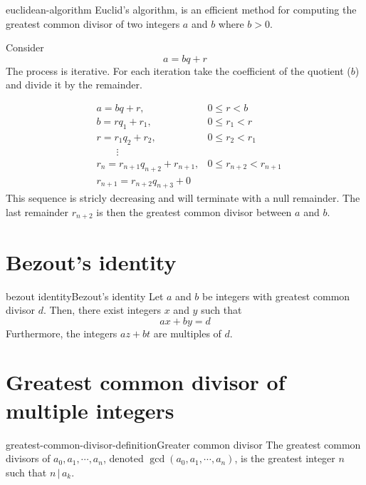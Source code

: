 \documentclass[preview]{standalone}
\newcommand{\divides}{\,|\,}
\begin{document}
\begin{snippet}{euclidean-algorithm}
Euclid's algorithm, is an efficient method for computing the greatest common divisor of two integers
\(a\) and \(b\) where \(b > 0\).

Consider
\[
    a = bq + r
\]
The process is iterative.
For each iteration take the coefficient of the quotient (\(b\)) and divide it by the remainder.

\begin{align*}
    &a = bq + r, &0 \leq r < b \\
    &b = rq_1 + r_1, &0 \leq r_1 < r \\
    &r = r_1q_2 + r_2, &0 \leq r_2 < r_1 \\
    \phantom{ } &\qquad \vdots & \\
    &r_n = r_{n+1}q_{n+2} + r_{n+1}, &0 \leq r_{n+2} < r_{n+1} \\
    &r_{n+1} = r_{n+2}q_{n+3} + 0&
\end{align*}
This sequence is stricly decreasing and will terminate with a null remainder.
The last remainder \(r_{n+2}\) is then the greatest common divisor between \(a\) and \(b\).
\end{snippet}

\section{Bezout's identity}

\begin{snippettheorem}{bezout identity}{Bezout's identity}
    Let \(a\) and \(b\) be integers with greatest common divisor \(d\).
    Then, there exist integers \(x\) and \(y\) such that
    \[
        ax+by=d
    \]
    Furthermore, the integers \(az+bt\) are multiples of \(d\).
\end{snippettheorem}

\section{Greatest common divisor of multiple integers}

\begin{snippetdefinition}{greatest-common-divisor-definition}{Greater common divisor}
The greatest common divisors of \(a_0, a_1, \cdots, a_n\), denoted \(\gcd(a_0, a_1, \cdots, a_n)\),
is the greatest integer \(n\) such that \(n \divides a_k\).
\end{snippetdefinition}
\end{document}
